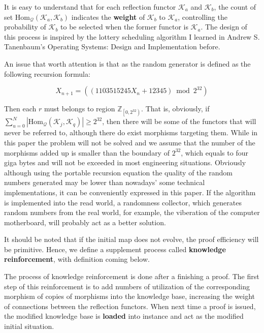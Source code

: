\documentclass{article}
\begin{document}
It is easy to understand that for each reflection functor \(\mathcal{K}_a\) and \(\mathcal{K}_b\), the count of set \(\text{Hom}_{\mathcal{Q}}\left(\mathcal{K}_a,\mathcal{K}_b\right)\) indicates the \textbf{ weight} of \(\mathcal{K}_b\) to \(\mathcal{K}_a\), controlling the probability of \(\mathcal{K}_b\) to be selected when the former functor is \(\mathcal{K}_a\). The design of this process is inspired by the lottery scheduling algorithm I learned in Andrew S. Tanenbaum{'}s Operating Systems: Design and Implementation \cite{6} before.

An issue that worth attention is that as the random generator is defined as the following recursion formula: \cite{5}

\[X_{n+1}=(\left(1103515245 X_n+12345\right) \bmod 2^{32})\]

Then each \(\mathit{r}\) must belongs to region \(\mathbb{Z}_{\left.\left[0,2^{32}\right.\right)}\). That is, obviously, if \(\sum _{u=0}^N \left|\text{Hom}_{\mathcal{Q}}\left(\mathcal{K}_j,\mathcal{K}_q\right)\right|\geq 2^{32}\), then there will be some of the functors that will never be referred to, although there do exist morphisms targeting them. While in this paper the problem will not be solved and we assume that the number of the morphisms added up is smaller than the boundary of \(2^{32}\), which equals to four giga bytes and will not be exceeded in most engineering situations. Obviously although using the portable recursion equation the quality of the random numbers generated may be lower than nowadays{'} some technical implementations, it can be conveniently expressed in this paper. If the algorithm is implemented into the read world, a randomness collector, which generates random numbers from the real world, for example, the viberation of the computer motherboard, will probably act as a better solution.

It should be noted that if the initial map does not evolve, the proof efficiency will be primitive. Hence, we define a supplement process called \textbf{ knowledge reinforcement}, with definition coming below.

 The process of knowledge reinforcement is done after a finishing a proof. The first step of this reinforcement is to add numbers of utilization of the corresponding morphism of copies of morphisms into the knowledge base, increasing the weight of connections between the reflection functors. When next time a proof is issued, the modified knowledge base is \textbf{ loaded} into instance and act as the modified initial situation.
\end{document}
